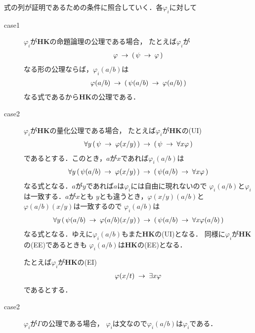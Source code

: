 	\begin{metaprf}
		式の列が証明であるための条件に照合していく．各$\varphi_{i}$に対して
		\begin{description}
			\item[case1] $\varphi_{i}$が{\bf HK}の命題論理の公理である場合，
				たとえば$\varphi_{i}$が
				\begin{align}
					\varphi \hspace{0.25em}\rightarrow\hspace{0.25em} (\, \psi \hspace{0.25em}\rightarrow\hspace{0.25em} \varphi\, )
				\end{align}
				なる形の公理ならば，$\varphi_{i}(a/b)$は
				\begin{align}
					\varphi(a/b) \hspace{0.25em}\rightarrow\hspace{0.25em} (\, \psi(a/b) \hspace{0.25em}\rightarrow\hspace{0.25em} \varphi(a/b)\, )
				\end{align}
				なる式であるから{\bf HK}の公理である．
				
			\item[case2] $\varphi_{i}$が{\bf HK}の量化公理である場合，
				たとえば$\varphi_{i}$が{\bf HK}の(UI)
				\begin{align}
					\forall y\, (\, \psi \hspace{0.25em}\rightarrow\hspace{0.25em} \varphi(x/y)\, )
					\hspace{0.25em}\rightarrow\hspace{0.25em} (\, \psi \hspace{0.25em}\rightarrow\hspace{0.25em} \forall x \varphi\, )
				\end{align}
				であるとする．このとき，$a$が$x$であれば$\varphi_{i}(a/b)$は
				\begin{align}
					\forall y\, (\, \psi(a/b) \hspace{0.25em}\rightarrow\hspace{0.25em} \varphi(x/y)\, )
					\hspace{0.25em}\rightarrow\hspace{0.25em} (\, \psi(a/b) \hspace{0.25em}\rightarrow\hspace{0.25em} \forall x \varphi\, )
				\end{align}
				なる式となる．$a$が$y$であれば$a$は$\varphi_{i}$には自由に現れないので
				$\varphi_{i}(a/b)$と$\varphi_{i}$は一致する．$a$が$x$とも
				$y$とも違うとき，$\varphi(x/y)(a/b)$と$\varphi(a/b)(x/y)$は一致するので
				$\varphi_{i}(a/b)$は
				\begin{align}
					\forall y\, (\, \psi(a/b) \hspace{0.25em}\rightarrow\hspace{0.25em} \varphi(a/b)(x/y)\, )
					\hspace{0.25em}\rightarrow\hspace{0.25em} (\, \psi(a/b) \hspace{0.25em}\rightarrow\hspace{0.25em} \forall x \varphi(a/b)\, )
				\end{align}
				なる式となる．ゆえに$\varphi_{i}(a/b)$もまた{\bf HK}の(UI)となる．
				同様に$\varphi_{i}$が{\bf HK}の(EE)であるときも
				$\varphi_{i}(a/b)$は{\bf HK}の(EE)となる．
				
				たとえば$\varphi_{i}$が{\bf HK}の(EI)
				\begin{align}
					\varphi(x/t) \hspace{0.25em}\rightarrow\hspace{0.25em} \exists x \varphi
				\end{align}
				であるとする．
				
			\item[case2] $\varphi_{i}$が$\Gamma$の公理である場合，
				$\varphi_{i}$は文なので$\varphi_{i}(a/b)$は$\varphi_{i}$である．
			

\end{description}
\end{metaprf}
